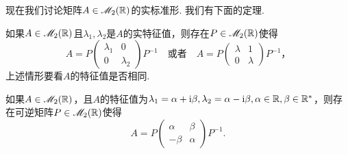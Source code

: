 现在我们讨论矩阵$A\in\mathscr M_2(\mathbb R)$的实标准形. 我们有下面的定理.
\begin{mybox}
  \begin{theorem}[实矩阵的实标准形.]
    \begin{enum}
      \item \label{thm2.10a}如果$A\in\mathscr M_2(\mathbb R)$且$\lambda_1,\lambda_2$是$A$的实特征值，则存在$P\in\mathscr M_2(\mathbb R)$使得
          \[
            A = P\begin{pmatrix}
              \lambda_1 & 0 \\
              0 & \lambda_2
            \end{pmatrix}P ^{-1}\quad\text{或者}\quad
            A = P\begin{pmatrix}
              \lambda & 1 \\
              0 & \lambda
            \end{pmatrix}P^{-1}，
          \]
          上述情形要看$A$的特征值是否相同.
      \item 如果$A\in\mathscr M_2(\mathbb R)$，且$A$的特征值为$\lambda_1=\alpha+\mathrm i\beta,\lambda_2=
          \alpha-\mathrm i\beta,\alpha\in\mathbb R,\beta\in\mathbb R^\ast$，则存在可逆矩阵$P\in\mathscr M_2(\mathbb R)$使得
          \[
            A = P \begin{pmatrix}
              \alpha & \beta \\
              -\beta & \alpha
            \end{pmatrix} P^{-1}.
          \]
    \end{enum}
  \end{theorem}
\end{mybox}

